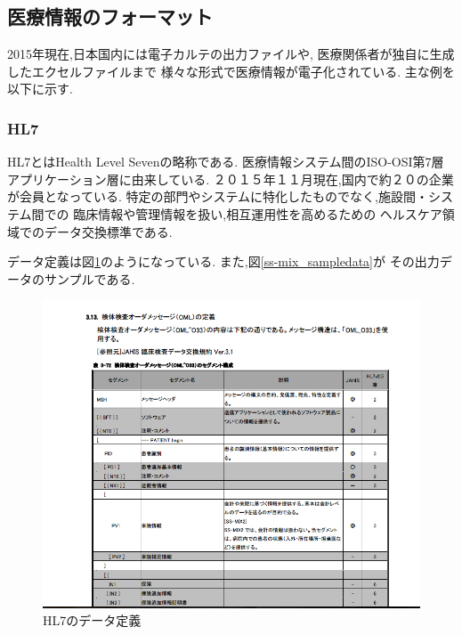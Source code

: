 \subsection{医療情報のフォーマット}
  2015年現在,日本国内には電子カルテの出力ファイルや,
  医療関係者が独自に生成したエクセルファイルまで
  様々な形式で医療情報が電子化されている.
  主な例を以下に示す.

  \subsubsection{HL7}
  HL7とはHealth Level Sevenの略称である.
  医療情報システム間のISO-OSI第7層アプリケーション層に由来している.
  ２０１５年１１月現在,国内で約２０の企業が会員となっている.
  特定の部門やシステムに特化したものでなく,施設間・システム間での
  臨床情報や管理情報を扱い,相互運用性を高めるための
  ヘルスケア領域でのデータ交換標準である.\cite{bibi5} \cite{bibi6}

  データ定義は図\ref{ss-mix_sample}のようになっている.
  また,図\ref{ss-mix_sampledata}が
  その出力データのサンプルである.

	\begin{figure}[htbp]
    \begin{center}
			\includegraphics[width=12cm, bb=0 0 792 630]{./gazou/ss-mix_sample.png} %
    \end{center}
    \caption{HL7のデータ定義}
		\label{ss-mix_sample}
	\end{figure}

